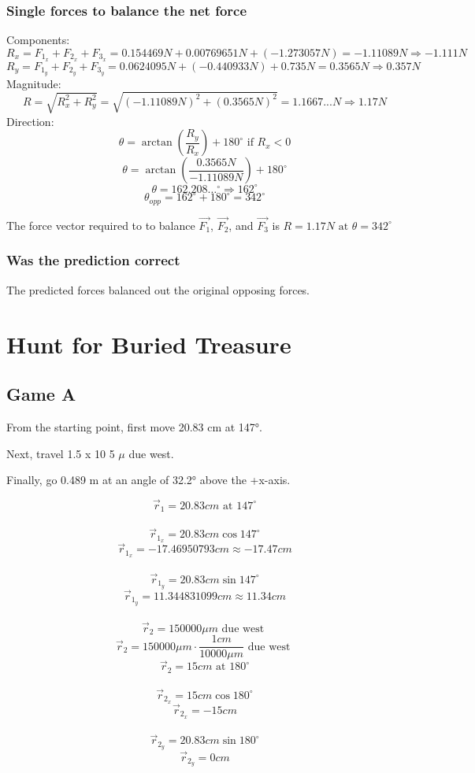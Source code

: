 \documentclass[11pt, letterpaper, includehead]{article}
\begin{document}
\subsubsection{Single forces to balance the net force} %
Components:
$$R_x = F_{1_x} + F_{2_x} + F_{3_x} = 0.154469N + 0.00769651N + (-1.273057N) = -1.11089N \Rightarrow \boxed{-1.111N} $$
$$R_y = F_{1_y} + F_{2_y} + F_{3_y} = 0.0624095N + (-0.440933N) + 0.735N = 0.3565N \Rightarrow \boxed{0.357N} $$
Magnitude:
$$R = \sqrt{R_x^2 + R_y^2} = \sqrt{(-1.11089N)^2 + (0.3565N)^2} = 1.1667...N \Rightarrow \boxed{1.17N}$$
Direction:
$$\theta = \arctan \left( \frac{R_y}{R_x} \right) + 180^{\circ} \text{ if } R_x < 0$$
$$\theta = \arctan \left( \frac{0.3565N}{-1.11089N} \right) + 180^{\circ}$$
$$\theta = 162.208\dots^{\circ} \Rightarrow {162^{\circ}}$$
$$\theta_{opp} = 162^{\circ} + 180^{\circ} = \boxed{342^{\circ}}$$

The force vector required to to balance $\vec{F_1}$, $\vec{F_2}$, and $\vec{F_3}$ is
$R = 1.17N \text{ at } \theta = 342^{\circ}$

\subsubsection{Was the prediction correct} %
The predicted forces balanced out the original opposing forces. 

\section{Hunt for Buried Treasure} %
\subsection{Game A} %
From the starting point, first move 20.83 cm at 147°.

Next, travel 1.5 x 10 5 $\mu$ due west.

Finally, go 0.489 m at an angle of 32.2° above the +x-axis.

$$\vec{r}_1 = 20.83cm\text{ at }147^{\circ}$$\\
$$\vec{r}_{1_x} = 20.83cm\cos147^{\circ}$$
$$\vec{r}_{1_x} = -17.46950793cm \approx -17.47cm$$\\
$$\vec{r}_{1_y} = 20.83cm\sin147^{\circ}$$
$$\vec{r}_{1_y} = 11.344831099cm \approx 11.34cm$$\\

$$\vec{r}_2 = 150000\mu m\text{ due west }$$
$$\vec{r}_2 = 150000\mu m\cdot\frac{1cm}{10000\mu m}\text{ due west }$$
$$\vec{r}_2 = 15cm\text{ at }180^{\circ}$$\\
$$\vec{r}_{2_x} = 15cm\cos180^{\circ}$$
$$\vec{r}_{2_x} = -15cm$$\\
$$\vec{r}_{2_y} = 20.83cm\sin180^{\circ}$$
$$\vec{r}_{2_y} = 0cm$$\\
\end{document}
